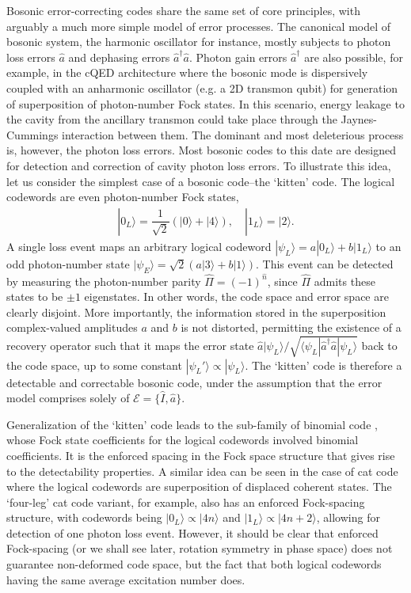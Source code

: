 \documentclass[%
 reprint,
superscriptaddress,
 amsmath,amssymb,
 aps,13pt
]{revtex4-2}
\begin{document}
Bosonic error-correcting codes share the same set of core principles, with arguably a much more simple model of error processes. The canonical model of bosonic system, the harmonic oscillator for instance, mostly subjects to photon loss errors $\hat{a}$ and dephasing errors $\hat{a}^\dagger \hat{a}$. Photon gain errors $\hat{a}^\dagger$ are also possible, for example, in the cQED architecture where the bosonic mode is dispersively coupled with an anharmonic oscillator (e.g. a 2D transmon qubit) for generation of superposition of photon-number Fock states. In this scenario, energy leakage to the cavity from the ancillary transmon could take place through the Jaynes-Cummings interaction between them. The dominant and most deleterious process is, however, the photon loss errors. Most bosonic codes to this date are designed for detection and correction of cavity photon loss errors. To illustrate this idea, let us consider the simplest case of a bosonic code--the `kitten' code. The logical codewords are even photon-number Fock states,
\begin{align}
    |0_L\rangle = \dfrac{1}{\sqrt{2}}\left(|0\rangle + |4\rangle\right),\quad |1_L\rangle = |2\rangle.
\end{align}
A single loss event maps an arbitrary logical codeword $|\psi_L\rangle = a|0_L\rangle + b|1_L\rangle$ to an odd photon-number state $|\psi_E\rangle =\sqrt{2}(a|3\rangle+b|1\rangle)$. This event can be detected by measuring the photon-number parity $\hat{\Pi}=(-1)^{\hat{n}}$, since $\hat{\Pi}$ admits these states to be $\pm 1$ eigenstates. In other words, the code space and error space are clearly disjoint. More importantly, the information stored in the superposition complex-valued amplitudes $a$ and $b$ is not distorted, permitting the existence of a recovery operator such that it maps the error state ${\hat{a}|\psi_L\rangle}/{\sqrt{\langle\psi_L|\hat{a}^\dagger\hat{a}|\psi_L\rangle}}$ back to the code space, up to some constant $ |\psi_L'\rangle \propto |\psi_L\rangle$. The `kitten' code is therefore a detectable and correctable bosonic code, under the assumption that the error model comprises solely of $\mathcal{E}=\{\hat{I}, \hat{a}\}$. 

Generalization of the `kitten' code leads to the sub-family of binomial code \cite{bin}, whose Fock state coefficients for the logical codewords involved binomial coefficients. It is the enforced spacing in the Fock space structure that gives rise to the detectability properties. A similar idea can be seen in the case of cat code \cite{Mirrahimi_2014} where the logical codewords are superposition of displaced coherent states. The `four-leg' cat code variant, for example, also has an enforced Fock-spacing structure, with codewords being $|0_L\rangle\propto |4n\rangle$ and $|1_L\rangle \propto |4n+2\rangle$, allowing for detection of one photon loss event. However, it should be clear that enforced Fock-spacing (or we shall see later, rotation symmetry in phase space) does not guarantee non-deformed code space, but the fact that both logical codewords having the same average excitation number does.     
\end{document}
